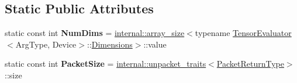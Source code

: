 \subsection*{Static Public Attributes}
\begin{DoxyCompactItemize}
\item 
\mbox{\label{struct_eigen_1_1_tensor_evaluator_3_01const_01_tensor_broadcasting_op_3_01_broadcast_00_01_arg_type_01_4_00_01_device_01_4_abce855688bf6617ec1824a206481d0d4}} 
static const int {\bfseries Num\+Dims} = \hyperlink{struct_eigen_1_1internal_1_1array__size}{internal\+::array\+\_\+size}$<$typename \hyperlink{struct_eigen_1_1_tensor_evaluator}{Tensor\+Evaluator}$<$Arg\+Type, Device$>$\+::\hyperlink{struct_eigen_1_1_d_sizes}{Dimensions}$>$\+::value
\item 
\mbox{\label{struct_eigen_1_1_tensor_evaluator_3_01const_01_tensor_broadcasting_op_3_01_broadcast_00_01_arg_type_01_4_00_01_device_01_4_a64e29c0805ce1d595cdb0349a3c0bfd2}} 
static const int {\bfseries Packet\+Size} = \hyperlink{struct_eigen_1_1internal_1_1unpacket__traits}{internal\+::unpacket\+\_\+traits}$<$\hyperlink{group___sparse_core___module}{Packet\+Return\+Type}$>$\+::size
\end{DoxyCompactItemize}
